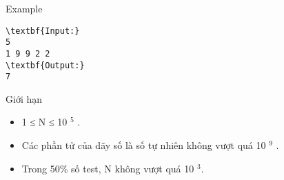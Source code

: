 Example
\begin{verbatim}
\textbf{Input:}
5
1 9 9 2 2
\textbf{Output:}
7\end{verbatim}
Giới hạn
\begin{itemize}
	\item 1 ≤ N ≤ 10 $^ 5 $ .
	\item Các phần tử của dãy số là số tự nhiên không vượt quá 10 $^ 9 $ .
	\item Trong 50\% số test, N không vượt quá 10 $^ 3$.
\end{itemize}